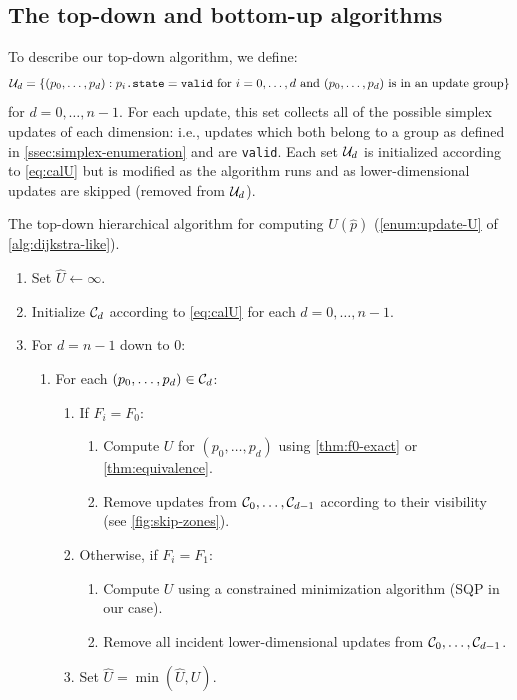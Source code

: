 \documentclass[eikonal.tex]{subfiles}
\begin{document}
\subsection{The top-down and bottom-up algorithms}

To describe our top-down algorithm, we define:
\begin{equation}\label{eq:calU}
  \calU_d = \set{(p_0, \hdots, p_d): p_i\texttt{.state}=\texttt{valid} \mbox{ for } i = 0, \hdots, d \mbox{ and } (p_0, \hdots, p_d) \mbox{ is in an update group}}
\end{equation}
for $d = 0, \hdots, n - 1$. For each update, this set collects all of
the possible simplex updates of each dimension: i.e., updates which
both belong to a group as defined in \cref{ssec:simplex-enumeration}
and are \texttt{valid}. Each set $\mathcal{U}_d$ is initialized according to
\cref{eq:calU} but is modified as the algorithm runs and as
lower-dimensional updates are skipped (removed from $\mathcal{U}_d$).

\begin{algorithm}[H]
  \caption{The top-down hierarchical algorithm for computing
    $U(\hat{p})$ (\cref{enum:update-U} of
    \cref{alg:dijkstra-like}).}\label{alg:top-down}
  \begin{enumerate}[nolistsep]
  \item Set $\hat{U} \gets \infty$.
  \item Initialize $\mathcal{C}_d$ according to \cref{eq:calU} for each
    $d = 0, \hdots, n - 1$.
  \item For $d = n - 1$ down to $0$:
    \begin{enumerate}
    \item For each $(p_0, \hdots, p_d) \in \mathcal{C}_d$:
      \begin{enumerate}
      \item If $F_i = F_0$:
        \begin{enumerate}
        \item Compute $U$ for $(p_0, \hdots, p_{d})$ using
          \cref{thm:f0-exact} or \cref{thm:equivalence}.
        \item Remove updates from $\mathcal{C}_0, \hdots, \mathcal{C}_{d-1}$
          according to their visibility (see \cref{fig:skip-zones}).
        \end{enumerate}
      \item Otherwise, if $F_i = F_1$:
        \begin{enumerate}
        \item Compute $U$ using a constrained minimization algorithm
          (SQP in our case).
        \item Remove all incident lower-dimensional updates from
          $\mathcal{C}_0, \hdots, \mathcal{C}_{d-1}$.
        \end{enumerate}
      \item Set $\hat{U} = \min(\hat{U}, U)$.
      \end{enumerate}
    \end{enumerate}
  \end{enumerate}
\end{algorithm}
\end{document}
